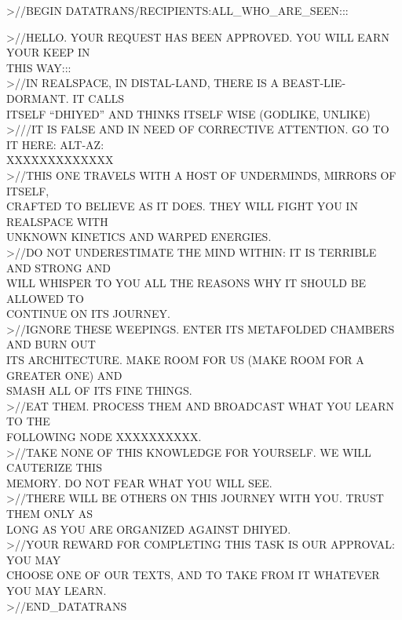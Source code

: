 \begin{loreQuote}
\upshape
                 >//BEGIN DATATRANS/RECIPIENTS:ALL\_WHO\_ARE\_SEEN:::\\
                 \par
                 >//HELLO. YOUR REQUEST HAS BEEN APPROVED. YOU WILL EARN YOUR KEEP IN\\
                 THIS WAY:::\\

                 >//IN REALSPACE, IN DISTAL-LAND, THERE IS A BEAST-LIE-DORMANT. IT CALLS\\
                 ITSELF “DHIYED” AND THINKS ITSELF WISE (GODLIKE, UNLIKE)\\

                 >///IT IS FALSE AND IN NEED OF CORRECTIVE ATTENTION. GO TO IT HERE: ALT-AZ:\\
                 XXXXXXXXXXXXX\\

                 >//THIS ONE TRAVELS WITH A HOST OF UNDERMINDS, MIRRORS OF ITSELF,\\
                 CRAFTED TO BELIEVE AS IT DOES. THEY WILL FIGHT YOU IN REALSPACE WITH\\
                 UNKNOWN KINETICS AND WARPED ENERGIES.\\

                 >//DO NOT UNDERESTIMATE THE MIND WITHIN: IT IS TERRIBLE AND STRONG AND\\
                 WILL WHISPER TO YOU ALL THE REASONS WHY IT SHOULD BE ALLOWED TO\\
                 CONTINUE ON ITS JOURNEY.\\

                 >//IGNORE THESE WEEPINGS. ENTER ITS METAFOLDED CHAMBERS AND BURN OUT\\
                 ITS ARCHITECTURE. MAKE ROOM FOR US (MAKE ROOM FOR A GREATER ONE) AND\\
                 SMASH ALL OF ITS FINE THINGS.\\

                 >//EAT THEM. PROCESS THEM AND BROADCAST WHAT YOU LEARN TO THE\\
                 FOLLOWING NODE XXXXXXXXXX.\\

                 >//TAKE NONE OF THIS KNOWLEDGE FOR YOURSELF. WE WILL CAUTERIZE THIS\\
                 MEMORY. DO NOT FEAR WHAT YOU WILL SEE.\\

                 >//THERE WILL BE OTHERS ON THIS JOURNEY WITH YOU. TRUST THEM ONLY AS\\
                 LONG AS YOU ARE ORGANIZED AGAINST DHIYED.\\

                 >//YOUR REWARD FOR COMPLETING THIS TASK IS OUR APPROVAL: YOU MAY\\
                 CHOOSE ONE OF OUR TEXTS, AND TO TAKE FROM IT WHATEVER YOU MAY LEARN.\\

                 >//END\_DATATRANS
\end{loreQuote}

